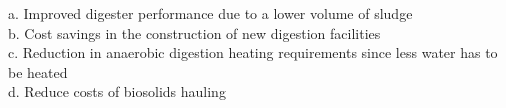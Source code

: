 \begin{tcolorbox}[breakable, enhanced,
colframe=blue!25,
colback=blue!10,
coltitle=blue!20!black,  
title= Chapter Assessment]
\begin{enumerate}
a. Improved digester performance due to a lower volume of sludge \\
b. Cost savings in the construction of new digestion facilities \\
c. Reduction in anaerobic digestion heating requirements since less water has to be heated \\
d. Reduce costs of biosolids hauling \\
\end{enumerate}
\end{tcolorbox}